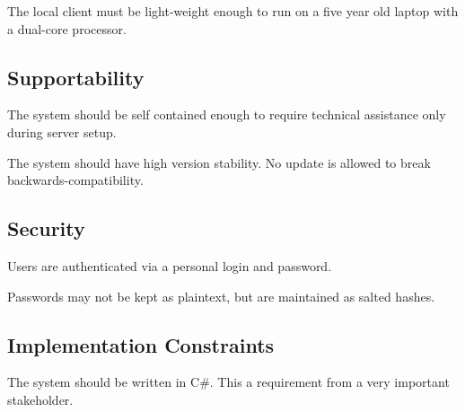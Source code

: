 The local client must be light-weight enough to run on a five year old laptop with a dual-core processor.

\subsection{Supportability}
The system should be self contained enough to require technical assistance only during server setup.

The system should have high version stability. No update is allowed to break backwards-compatibility.

\subsection{Security}
Users are authenticated via a personal login and password.

Passwords may not be kept as plaintext, but are maintained as salted hashes.

\subsection{Implementation Constraints}
The system should be written in C\#. This a requirement from a very important stakeholder.
